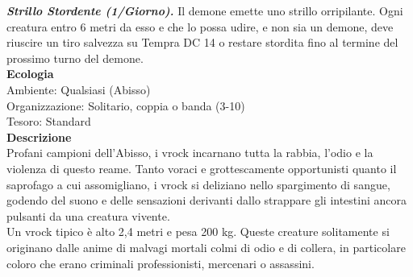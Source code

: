 \begin{multicols}{2}
\emph{\textbf{Strillo Stordente (1/Giorno).}} Il demone emette uno strillo orripilante. Ogni creatura entro 6 metri da esso e che lo possa udire, e non sia un demone, deve riuscire un tiro salvezza su Tempra DC 14 o restare stordita fino al termine del prossimo turno del demone.\\
\textbf{Ecologia}\\
Ambiente: Qualsiasi (Abisso)\\
Organizzazione: Solitario, coppia o banda (3-10)\\
Tesoro: Standard\\
\textbf{Descrizione}\\
Profani campioni dell’Abisso, i vrock incarnano tutta la rabbia, l’odio e la violenza di questo reame. Tanto voraci e grottescamente opportunisti quanto il saprofago a cui assomigliano, i vrock si deliziano nello spargimento di sangue, godendo del suono e delle sensazioni derivanti dallo strappare gli intestini ancora pulsanti da una creatura vivente.\\
Un vrock tipico è alto 2,4 metri e pesa 200 kg. Queste creature solitamente si originano dalle anime di malvagi mortali colmi di odio e di collera, in particolare coloro che erano criminali professionisti, mercenari o assassini.\\


\end{multicols}
